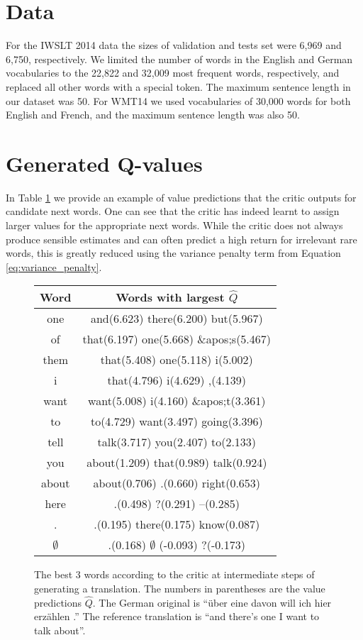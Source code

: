 \documentclass{article} \usepackage{iclr2017_conference,times}
\begin{document}
\section{Data}
\label{sec:data}
For the IWSLT 2014 data the sizes of validation and tests set were 6,969 and 6,750, 
respectively. We limited the number of words in the English and German
vocabularies to the 22,822 and 32,009 most frequent words, respectively, and
replaced all other words with a special token. The maximum sentence length
in our dataset was 50. For WMT14 we used vocabularies of 30,000 words for both English and French, and the maximum sentence length was also 50.


\section{Generated Q-values}

In Table \ref{tab:qvalues} we provide an example of value predictions
that the critic outputs for candidate next words. One can see that the critic has
indeed learnt to assign larger values for the appropriate next words.
While the critic does not always produce sensible estimates and can often predict
a high return for irrelevant rare words, this is greatly reduced using the variance
penalty term from Equation \eqref{eq:variance_penalty}.

\begin{figure}[h]\centering
\label{tab:qvalues}
\caption{The best 3 words according to the critic at intermediate
        steps of generating a translation. The numbers in parentheses
        are the value predictions $\hat{Q}$. The German original is 
        ``\"{u}ber eine davon will ich hier erz\"{a}hlen .''
        The reference translation is 
        ``and there's one I want to talk about''.}

\begin{tabular}{c|c}
    \textrm{Word} & \textrm{Words with largest $\hat{Q}$} \\
    \hline
one &
    and(6.623) there(6.200) but(5.967) \\
    of &
    that(6.197) one(5.668) \&apos;s(5.467) \\
    them &
    that(5.408) one(5.118) i(5.002) \\
    i &
    that(4.796) i(4.629) ,(4.139) \\
    want &
    want(5.008) i(4.160) \&apos;t(3.361) \\
    to &
    to(4.729) want(3.497) going(3.396) \\
    tell &
    talk(3.717) you(2.407) to(2.133) \\
    you &
    about(1.209) that(0.989) talk(0.924) \\
    about &
    about(0.706) .(0.660) right(0.653) \\
    here &
    .(0.498) ?(0.291) --(0.285) \\
    . &
    .(0.195) there(0.175) know(0.087) \\
     $\emptyset$  &
    .(0.168)  $\emptyset$ (-0.093) ?(-0.173) \\
\end{tabular}
\end{figure}
\end{document}
